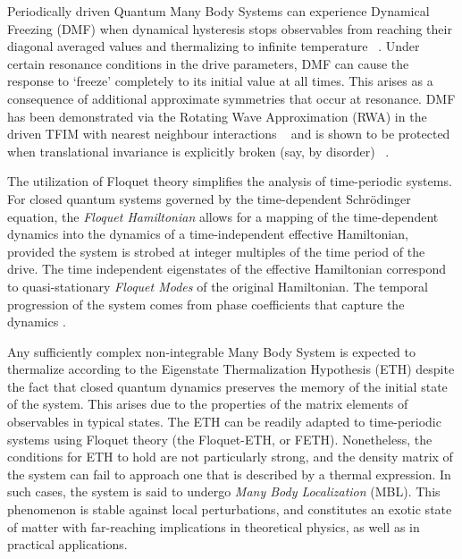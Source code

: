 \documentclass[%
reprint,
superscriptaddress,
amsmath,amssymb,
aps,
prb,
showkeys,
]{revtex4-2}
\begin{document}
	\maketitle
	
	Periodically driven Quantum Many Body Systems can experience Dynamical Freezing (DMF) when  dynamical hysteresis stops observables from reaching their diagonal averaged values and thermalizing to infinite temperature ~\cite{bordia_periodically_2017, sahoo_periodically_2019, das_exotic_2010}. Under certain resonance conditions in the drive parameters, DMF can cause the response to ‘freeze’ completely to its initial value at all times. This arises as a consequence of additional approximate symmetries that occur at resonance. DMF has been demonstrated via the Rotating Wave Approximation (RWA) in the driven TFIM with nearest neighbour interactions ~\cite{mbeng_quantum_2020} and is shown to be protected when translational invariance is explicitly broken (say, by disorder) ~\cite{yamada_localization_2022, roy_fate_2015}. 

	The utilization of Floquet theory simplifies the analysis of time-periodic systems. For closed quantum systems governed by the time-dependent Schr\"odinger equation, the \textit{Floquet Hamiltonian} allows for a mapping 
of the time-dependent dynamics into the dynamics of 	
a time-independent effective Hamiltonian, provided the system is strobed at integer multiples of the time period of the drive. The time independent eigenstates of the effective Hamiltonian correspond to quasi-stationary \textit{Floquet Modes} of the original Hamiltonian. The temporal progression of the system comes from  phase coefficients that capture the dynamics \cite{li_floquet_2018,eckardt_high_frequency_2015}.	
	
	Any sufficiently complex non-integrable Many Body System is expected to thermalize according to the Eigenstate Thermalization Hypothesis (ETH) despite the fact that closed quantum dynamics preserves the memory of the initial state of the system. This arises due to the properties of the matrix elements of observables 
	in typical states\cite{zhang_floquet_2016}. The ETH can be readily adapted to time-periodic systems using Floquet theory (the Floquet-ETH, or FETH). Nonetheless, the conditions for ETH to hold are not particularly strong, and the density matrix of the system can fail to approach one that is described by a thermal expression. In such cases, the system is said to undergo \textit{Many Body Localization} (MBL)\cite{khemani_phase_2016}. This phenomenon is stable against local perturbations, and constitutes an exotic state of matter with far-reaching implications in theoretical physics, as well as in practical applications\cite{yunger_halpern_quantum_2019}.
	
\end{document}
